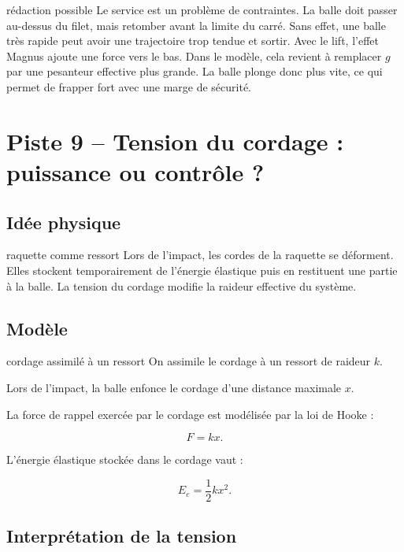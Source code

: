 \documentclass[11pt,a4paper]{article}
\begin{document}
\begin{oral}{rédaction possible}
Le service est un problème de contraintes. La balle doit passer au-dessus du filet, mais retomber avant la limite du carré. Sans effet, une balle très rapide peut avoir une trajectoire trop tendue et sortir. Avec le lift, l'effet Magnus ajoute une force vers le bas. Dans le modèle, cela revient à remplacer $g$ par une pesanteur effective plus grande. La balle plonge donc plus vite, ce qui permet de frapper fort avec une marge de sécurité.
\end{oral}

\section{Piste 9 -- Tension du cordage : puissance ou contrôle ?}

\subsection{Idée physique}

\begin{idee}{raquette comme ressort}
Lors de l'impact, les cordes de la raquette se déforment. Elles stockent temporairement de l'énergie élastique puis en restituent une partie à la balle. La tension du cordage modifie la raideur effective du système.
\end{idee}

\subsection{Modèle}

\begin{modele}{cordage assimilé à un ressort}
On assimile le cordage à un ressort de raideur $k$.

Lors de l'impact, la balle enfonce le cordage d'une distance maximale $x$.

La force de rappel exercée par le cordage est modélisée par la loi de Hooke :

\[
F=kx.
\]

L'énergie élastique stockée dans le cordage vaut :

\[
E_e=\frac12kx^2.
\]
\end{modele}

\subsection{Interprétation de la tension}
\end{document}

